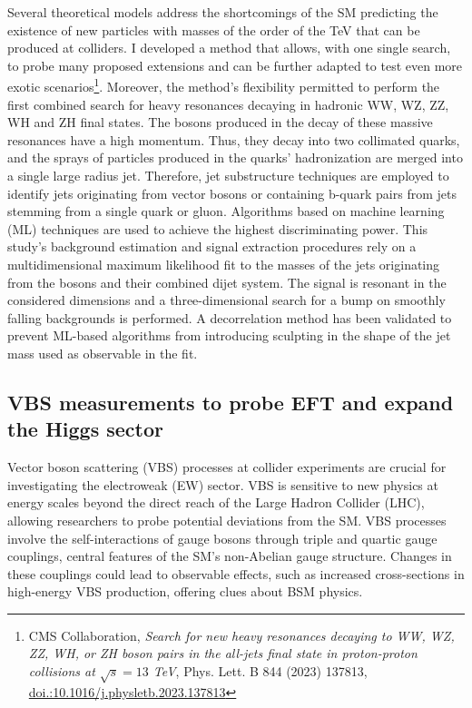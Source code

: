 {\begin{flushleft}
Several theoretical models address the shortcomings of the SM predicting the existence of new particles with masses of the order of the TeV that can be produced at colliders. I developed a method that allows, with one single search, to probe many proposed extensions and can be further adapted to test even more exotic scenarios\footnote{CMS Collaboration, {\em Search for new heavy resonances decaying to WW, WZ, ZZ, WH, or ZH boson pairs in the all-jets final state in proton-proton collisions at $\sqrt{s}=13$ TeV}, Phys. Lett. B 844 (2023) 137813, \href{http://dx.doi.org/10.1016/j.physletb.2023.137813}{doi.:10.1016/j.physletb.2023.137813}}. Moreover, the method’s flexibility permitted to perform the first combined search for heavy resonances decaying in hadronic WW, WZ, ZZ, WH and ZH final states. The bosons produced in the decay of these massive resonances have a high momentum. Thus, they decay into two collimated quarks, and the sprays of particles produced in the quarks' hadronization are merged into a single large radius jet. Therefore, jet substructure techniques are employed to identify jets originating from vector bosons or containing b-quark pairs from jets stemming from a single quark or gluon. Algorithms based on machine learning (ML) techniques are used to achieve the highest discriminating power. This study’s background estimation and signal extraction procedures rely on a multidimensional maximum likelihood fit to the masses of the jets originating from the bosons and their combined dijet system. The signal is resonant in the considered dimensions and a three-dimensional search for a bump on smoothly falling backgrounds is performed. A decorrelation method has been validated to prevent ML-based algorithms from introducing sculpting in the shape of the jet mass used as observable in the fit.
\vspace{\baselineskip}
\subsection{VBS measurements to probe EFT and expand the Higgs sector}
\vspace{\baselineskip}
Vector boson scattering (VBS) processes at collider experiments are crucial for investigating the electroweak (EW) sector. VBS is sensitive to new physics at energy scales beyond the direct reach of the Large Hadron Collider (LHC), allowing researchers to probe potential deviations from the SM. VBS processes involve the self-interactions of gauge bosons through triple and quartic gauge couplings, central features of the SM's non-Abelian gauge structure. Changes in these couplings could lead to observable effects, such as increased cross-sections in high-energy VBS production, offering clues about BSM physics.


\end{flushleft}}
